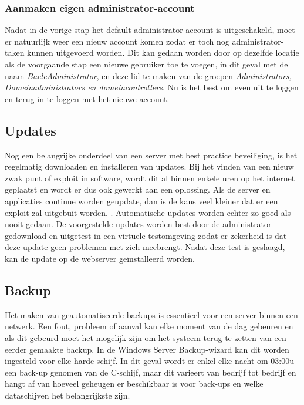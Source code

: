\documentclass[pdftex,a4paper,12pt]{report}
\begin{document}
\subsubsection{Aanmaken eigen administrator-account}
Nadat in de vorige stap het default administrator-account is uitgeschakeld, moet er natuurlijk weer een nieuw account komen zodat er toch nog administrator-taken kunnen uitgevoerd worden. Dit kan gedaan worden door op dezelfde locatie als de voorgaande stap een nieuwe gebruiker toe te voegen, in dit geval met de naam \textit{BaeleAdministrator}, en deze lid te maken van de groepen \textit{Administrators, Domeinadministrators en domeincontrollers}. Nu is het best om even uit te loggen en terug in te loggen met het nieuwe account.

\subsection{Updates}
Nog een belangrijke onderdeel van een server met best practice beveiliging, is het regelmatig downloaden en installeren van updates. Bij het vinden van een nieuw zwak punt of exploit in software, wordt dit al binnen enkele uren op het internet geplaatst en wordt er dus ook gewerkt aan een oplossing. Als de server en applicaties continue worden geupdate, dan is de kans veel kleiner dat er een exploit zal uitgebuit worden. \citep{Cott2012}. Automatische updates worden echter zo goed als nooit gedaan. De voorgestelde updates worden best door de administrator gedownload en uitgetest in een virtuele testomgeving zodat er zekerheid is dat deze update geen problemen met zich meebrengt. Nadat deze test is geslaagd, kan de update op de webserver geïnstalleerd worden.

\subsection{Backup}
Het maken van geautomatiseerde backups is essentieel voor een server binnen een netwerk. Een fout, probleem of aanval kan elke moment van de dag gebeuren en als dit gebeurd moet het mogelijk zijn om het systeem terug te zetten van een eerder gemaakte backup. In de Windows Server Backup-wizard kan dit worden ingesteld voor elke harde schijf. In dit geval wordt er enkel elke nacht om 03:00u een back-up genomen van de C-schijf, maar dit varieert van bedrijf tot bedrijf en hangt af van hoeveel geheugen er beschikbaar is voor back-ups en welke dataschijven het belangrijkste zijn. 
\end{document}

